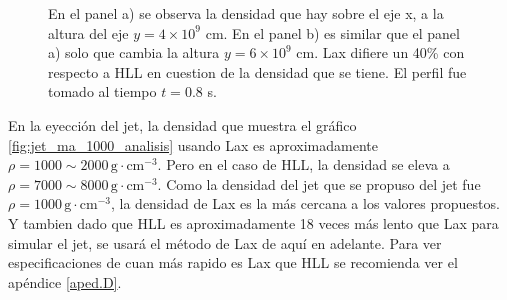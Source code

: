 \documentclass[12pt,a4paper]{book}
\begin{document}
\begin{figure}
\centering
{}
\caption{\label{fig:perfil_densidades_jet}En el panel a) se observa la densidad que hay sobre el eje x, a la altura del eje $y = 4 \times 10^{9}$ cm. En el panel b) es similar que el panel a) solo que cambia la altura $y = 6 \times 10^{9}$ cm. Lax difiere un 40\% con respecto a HLL en cuestion de la densidad que se tiene. El perfil fue tomado al tiempo $t = 0.8$ s.}
\end{figure}
En la eyección del jet, la densidad que muestra el gráfico \ref{fig:jet_ma_1000_analisis} usando Lax es aproximadamente $\rho = 1000 \sim 2000 \, \mathrm{g} \cdot \mathrm{cm}^{-3}$. Pero en el caso de HLL, la densidad se eleva a $\rho = 7000 \sim 8000 \, \mathrm{g} \cdot \mathrm{cm}^{-3}$. Como la densidad del jet que se propuso del jet fue $\rho = 1000 \, \mathrm{g} \cdot \mathrm{cm}^{-3}$, la densidad de Lax es la más cercana a los valores propuestos. Y tambien dado que HLL es aproximadamente 18 veces más lento que Lax para simular el jet, se usará el método de Lax de aquí en adelante.
 Para ver especificaciones de cuan más rapido es Lax que HLL se recomienda ver el apéndice \ref{aped.D}.
\end{document}
